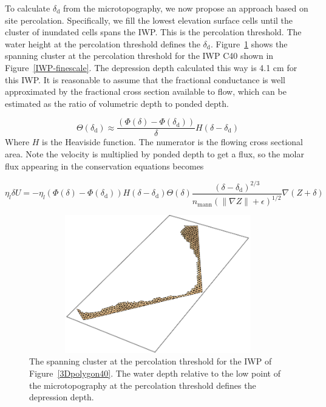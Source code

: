 \documentclass[review,11pt]{elsarticle}
\begin{document}
To calculate $\delta_\text{d}$ from the microtopography, we now propose an approach based on site percolation. Specifically, we fill the lowest elevation surface cells until the cluster of inundated cells spans the IWP. This is the percolation threshold. The water height at the percolation threshold defines the $\delta_\text{d}$. Figure~\ref{perc-cluster-poly40} shows the spanning cluster at the percolation threshold for the IWP C40 shown in Figure~\ref{IWP-finescale}. The depression depth calculated this way is 4.1 cm for this IWP.
It is reasonable to assume that the fractional conductance is well approximated by the fractional cross section available to flow, which can be estimated as the ratio of volumetric depth to ponded depth.

\begin{equation}
\Theta {(\delta_\text{d})} \approx \frac{( \Phi (\delta) - \Phi (\delta_\text{d}))} {\delta} H \left( \delta - \delta_\text{d}\right )
\end{equation}
Where $H$ is the Heaviside function. The numerator is the flowing cross sectional area. Note the velocity is multiplied by ponded depth to get a flux, so the molar flux appearing in the conservation equations becomes

\begin{equation}
\eta_{l} \delta U = - \eta_l  ( \Phi (\delta) - \Phi (\delta_\text{d})) H \left( \delta - \delta_\text{d}\right ) \Theta(\delta) \frac{(\delta - \delta_\text{d})^{2/3}}{n_\text{mann} (\| \nabla Z \| +\epsilon)^{1/2}} \nabla(Z + \delta)
\end{equation}
\begin{figure}
\centering
\includegraphics[width=12cm, height=6cm]{./figures/polygons-finescale/percolation-cluster-poly40.png}
\caption{The spanning cluster at the percolation threshold for the IWP of Figure~\ref{3Dpolygon40}. The water depth relative to the low point of the microtopography at the percolation threshold defines the depression depth.}
\label{perc-cluster-poly40}
\end{figure}
\end{document}
